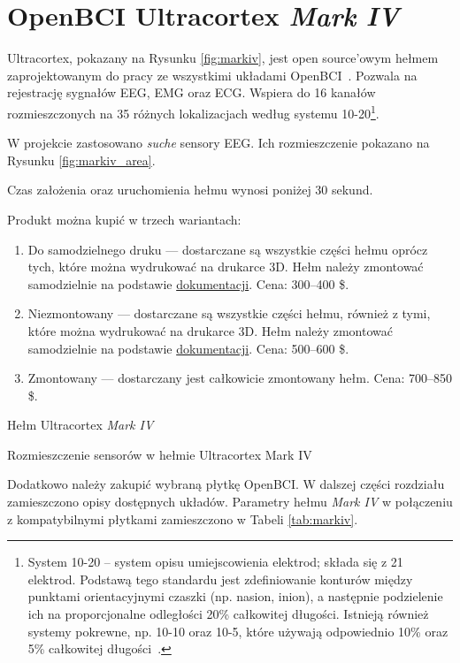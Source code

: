 \documentclass[skorowidz,skroty]{dyplomWEZUT}
\begin{document}
\section{OpenBCI Ultracortex \textit{Mark IV}\label{sec:markiv}}
Ultracortex, pokazany na Rysunku \vref{fig:markiv}, jest open source'owym hełmem zaprojektowanym do pracy ze wszystkimi układami OpenBCI~\cite{markiv_shop}. Pozwala na rejestrację sygnałów EEG, EMG oraz ECG. Wspiera do 16 kanałów rozmieszczonych na 35 różnych lokalizacjach według systemu 10-20\footnote{System 10-20 -- system opisu umiejscowienia elektrod; składa się z 21 elektrod. Podstawą tego standardu jest zdefiniowanie konturów między punktami orientacyjnymi czaszki (np. nasion, inion), a następnie podzielenie ich na proporcjonalne odległości 20\% całkowitej długości. Istnieją również systemy pokrewne, np. 10-10 oraz 10-5, które używają odpowiednio 10\% oraz 5\% całkowitej długości~\cite[rozdz. 6]{bci_principles}.}.

W projekcie zastosowano \textit{suche} sensory EEG. Ich rozmieszczenie pokazano na Rysunku \vref{fig:markiv_area}.

Czas założenia oraz uruchomienia hełmu wynosi poniżej 30 sekund.

Produkt można kupić w trzech wariantach:
\begin{enumerate}
    \item Do samodzielnego druku --- dostarczane są wszystkie części hełmu oprócz tych, które można wydrukować na drukarce 3D. Hełm należy zmontować samodzielnie na podstawie \href{https://docs.openbci.com/Headware/01-Ultracortex-Mark-IV#ultracortex-mark-iv-assembly-instructions}{dokumentacji}. Cena: 300--400 \$.
    \item Niezmontowany --- dostarczane są wszystkie części hełmu, również z tymi, które można wydrukować na drukarce 3D. Hełm należy zmontować samodzielnie na podstawie \href{https://docs.openbci.com/Headware/01-Ultracortex-Mark-IV#ultracortex-mark-iv-assembly-instructions}{dokumentacji}. Cena: 500--600 \$.
    \item Zmontowany --- dostarczany jest całkowicie zmontowany hełm. Cena: 700--850 \$.
\end{enumerate}

{Hełm Ultracortex \textit{Mark IV}\label{fig:markiv}}
{\cite{markiv}}

{Rozmieszczenie sensorów w hełmie Ultracortex Mark IV\label{fig:markiv_area}}
{\cite{markiv_shop}}

Dodatkowo należy zakupić wybraną płytkę OpenBCI. W dalszej części rozdziału zamieszczono opisy dostępnych układów. Parametry hełmu \textit{Mark IV} w połączeniu z kompatybilnymi płytkami zamieszczono w Tabeli \vref{tab:markiv}.
\end{document}
